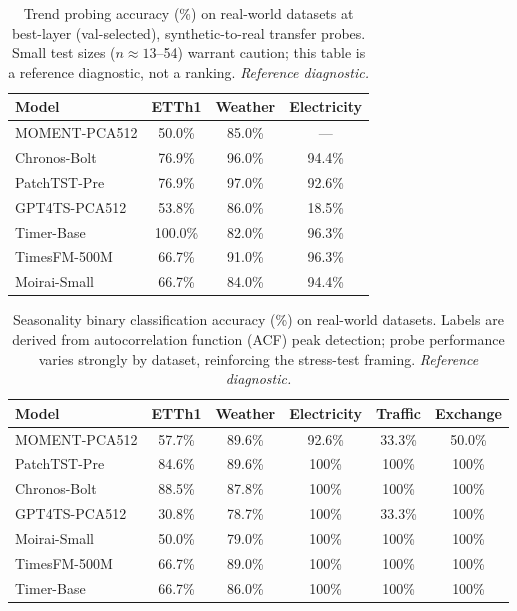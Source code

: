 \documentclass{article}
\begin{document}
\begin{table}[tbp]
\caption{Trend probing accuracy (\%) on real-world datasets at best-layer (val-selected), synthetic-to-real transfer probes. Small test sizes ($n \approx 13$--54) warrant caution; this table is a reference diagnostic, not a ranking. \emph{Reference diagnostic.}}
\label{tab:real_world_trend_main}
\centering
\begin{tabular}{lccc}
\toprule
Model & ETTh1 & Weather & Electricity \\
\midrule
MOMENT-PCA512 & 50.0\% & 85.0\% & --- \\
Chronos-Bolt & 76.9\% & 96.0\% & 94.4\% \\
PatchTST-Pre & 76.9\% & 97.0\% & 92.6\% \\
GPT4TS-PCA512 & 53.8\% & 86.0\% & 18.5\% \\
Timer-Base & 100.0\% & 82.0\% & 96.3\% \\
TimesFM-500M & 66.7\% & 91.0\% & 96.3\% \\
Moirai-Small & 66.7\% & 84.0\% & 94.4\% \\
\bottomrule
\end{tabular}
\end{table}

\begin{table}[tbp]
\caption{Seasonality binary classification accuracy (\%) on real-world datasets. Labels are derived from autocorrelation function (ACF) peak detection; probe performance varies strongly by dataset, reinforcing the stress-test framing. \emph{Reference diagnostic.}}
\label{tab:seasonality_binary_main}
\centering
\begin{tabular}{lccccc}
\toprule
Model & ETTh1 & Weather & Electricity & Traffic & Exchange \\
\midrule
MOMENT-PCA512 & 57.7\% & 89.6\% & 92.6\% & 33.3\% & 50.0\% \\
PatchTST-Pre & 84.6\% & 89.6\% & 100\% & 100\% & 100\% \\
Chronos-Bolt & 88.5\% & 87.8\% & 100\% & 100\% & 100\% \\
GPT4TS-PCA512 & 30.8\% & 78.7\% & 100\% & 33.3\% & 100\% \\
Moirai-Small & 50.0\% & 79.0\% & 100\% & 100\% & 100\% \\
TimesFM-500M & 66.7\% & 89.0\% & 100\% & 100\% & 100\% \\
Timer-Base & 66.7\% & 86.0\% & 100\% & 100\% & 100\% \\
\bottomrule
\end{tabular}
\end{table}
\end{document}
